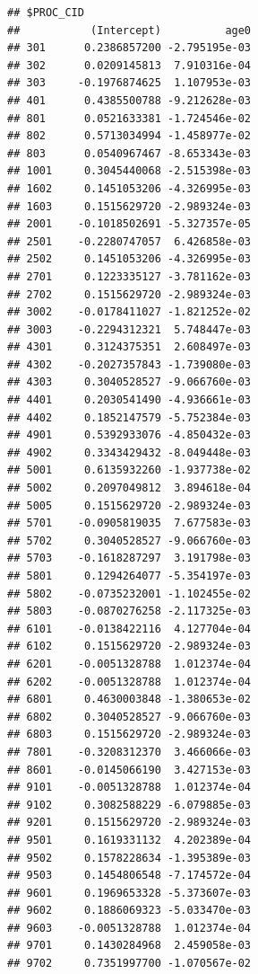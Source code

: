 \begin{frame}[fragile]

\small

\begin{Shaded}
\begin{Highlighting}[]
\end{Highlighting}
\end{Shaded}

\begin{verbatim}
## $PROC_CID
##           (Intercept)          age0
## 301      0.2386857200 -2.795195e-03
## 302      0.0209145813  7.910316e-04
## 303     -0.1976874625  1.107953e-03
## 401      0.4385500788 -9.212628e-03
## 801      0.0521633381 -1.724546e-02
## 802      0.5713034994 -1.458977e-02
## 803      0.0540967467 -8.653343e-03
## 1001     0.3045440068 -2.515398e-03
## 1602     0.1451053206 -4.326995e-03
## 1603     0.1515629720 -2.989324e-03
## 2001    -0.1018502691 -5.327357e-05
## 2501    -0.2280747057  6.426858e-03
## 2502     0.1451053206 -4.326995e-03
## 2701     0.1223335127 -3.781162e-03
## 2702     0.1515629720 -2.989324e-03
## 3002    -0.0178411027 -1.821252e-02
## 3003    -0.2294312321  5.748447e-03
## 4301     0.3124375351  2.608497e-03
## 4302    -0.2027357843 -1.739080e-03
## 4303     0.3040528527 -9.066760e-03
## 4401     0.2030541490 -4.936661e-03
## 4402     0.1852147579 -5.752384e-03
## 4901     0.5392933076 -4.850432e-03
## 4902     0.3343429432 -8.049448e-03
## 5001     0.6135932260 -1.937738e-02
## 5002     0.2097049812  3.894618e-04
## 5005     0.1515629720 -2.989324e-03
## 5701    -0.0905819035  7.677583e-03
## 5702     0.3040528527 -9.066760e-03
## 5703    -0.1618287297  3.191798e-03
## 5801     0.1294264077 -5.354197e-03
## 5802    -0.0735232001 -1.102455e-02
## 5803    -0.0870276258 -2.117325e-03
## 6101    -0.0138422116  4.127704e-04
## 6102     0.1515629720 -2.989324e-03
## 6201    -0.0051328788  1.012374e-04
## 6202    -0.0051328788  1.012374e-04
## 6801     0.4630003848 -1.380653e-02
## 6802     0.3040528527 -9.066760e-03
## 6803     0.1515629720 -2.989324e-03
## 7801    -0.3208312370  3.466066e-03
## 8601    -0.0145066190  3.427153e-03
## 9101    -0.0051328788  1.012374e-04
## 9102     0.3082588229 -6.079885e-03
## 9201     0.1515629720 -2.989324e-03
## 9501     0.1619331132  4.202389e-04
## 9502     0.1578228634 -1.395389e-03
## 9503     0.1454806548 -7.174572e-04
## 9601     0.1969653328 -5.373607e-03
## 9602     0.1886069323 -5.033470e-03
## 9603    -0.0051328788  1.012374e-04
## 9701     0.1430284968  2.459058e-03
## 9702     0.7351997700 -1.070567e-02

\end{verbatim}
\end{frame}
